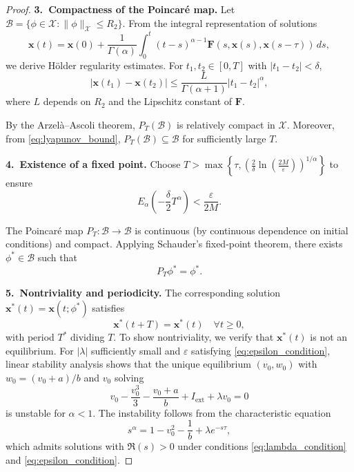 \documentclass[12pt,a4paper]{article}
\numberwithin{equation}{section}
\begin{document}
\begin{proof}
	\noindent\textbf{3.~Compactness of the Poincaré map.}
	Let $\mathcal{B} = \{\phi \in \mathcal{X} : \|\phi\|_{\mathcal{X}} \leq R_2\}$.
	From the integral representation of solutions
	\begin{equation}
		\mathbf{x}(t) = \mathbf{x}(0) + \frac{1}{\Gamma(\alpha)} \int_0^t (t-s)^{\alpha-1} \mathbf{F}(s,\mathbf{x}(s),\mathbf{x}(s-\tau))\, ds,
		\label{eq:solution_representation}
	\end{equation}
	we derive Hölder regularity estimates. For $t_1, t_2 \in [0, T]$ with $|t_1 - t_2| < \delta$,
	\begin{equation}
		|\mathbf{x}(t_1) - \mathbf{x}(t_2)| \leq \frac{L}{\Gamma(\alpha+1)} |t_1 - t_2|^\alpha,
		\label{eq:holder_estimate}
	\end{equation}
	where $L$ depends on $R_2$ and the Lipschitz constant of $\mathbf{F}$.
	
	By the Arzelà--Ascoli theorem, $P_T(\mathcal{B})$ is relatively compact in $\mathcal{X}$.
	Moreover, from \eqref{eq:lyapunov_bound}, $P_T(\mathcal{B}) \subseteq \mathcal{B}$ for sufficiently large $T$.
	
	\noindent\textbf{4.~Existence of a fixed point.}
	Choose $T > \max\left\{\tau, \left(\frac{2}{\delta}\ln\left(\frac{2M}{\varepsilon}\right)\right)^{1/\alpha}\right\}$ to ensure
	\begin{equation}
		E_\alpha\left(-\frac{\delta}{2} T^\alpha\right) < \frac{\varepsilon}{2M}.
		\label{eq:period_condition}
	\end{equation}
	
	The Poincaré map $P_T: \mathcal{B} \to \mathcal{B}$ is continuous (by continuous dependence on initial conditions) and compact. 
	Applying Schauder's fixed-point theorem, there exists $\phi^* \in \mathcal{B}$ such that
	\begin{equation}
		P_T \phi^* = \phi^*.
		\label{eq:fixed_point}
	\end{equation}
	
	\noindent\textbf{5.~Nontriviality and periodicity.}
	The corresponding solution $\mathbf{x}^*(t) = \mathbf{x}(t; \phi^*)$ satisfies
	\begin{equation}
		\mathbf{x}^*(t+T) = \mathbf{x}^*(t) \quad \forall t \geq 0,
		\label{eq:periodicity}
	\end{equation}
	with period $T^*$ dividing $T$. To show nontriviality, we verify that $\mathbf{x}^*(t)$ is not an equilibrium. 
	For $|\lambda|$ sufficiently small and $\varepsilon$ satisfying \eqref{eq:epsilon_condition}, linear stability analysis shows that the unique equilibrium $(v_0, w_0)$ with $w_0 = (v_0+a)/b$ and $v_0$ solving
	\begin{equation}
		v_0 - \frac{v_0^3}{3} - \frac{v_0+a}{b} + I_{\text{ext}} + \lambda v_0 = 0
		\label{eq:equilibrium}
	\end{equation}
	is unstable for $\alpha < 1$. The instability follows from the characteristic equation
	\begin{equation}
		s^\alpha = 1 - v_0^2 - \frac{1}{b} + \lambda e^{-s\tau},
		\label{eq:characteristic}
	\end{equation}
	which admits solutions with $\Re(s) > 0$ under conditions \eqref{eq:lambda_condition} and \eqref{eq:epsilon_condition}.
	

\end{proof}
\end{document}
